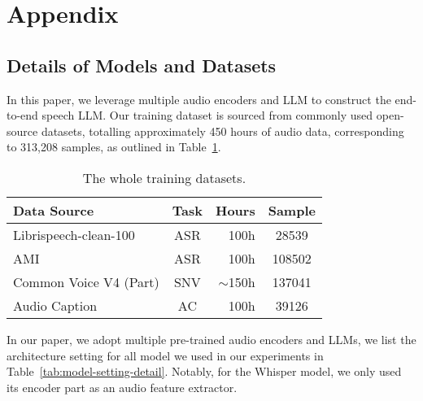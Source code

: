\newpage

\section{Appendix}
\label{sec:appendix}

\subsection{Details of Models and Datasets}\label{sec:appendix-datas-and-model}

In this paper, we leverage multiple audio encoders and LLM to construct the end-to-end speech LLM. Our training dataset is sourced from commonly used open-source datasets, totalling approximately 450 hours of audio data, corresponding to 313,208 samples, as outlined in Table~\ref{tab:whole-training-dataset}. 

\begin{table}[htp]
\small
\centering
\caption{The whole training datasets.}
\label{tab:whole-training-dataset}
\begin{tabular}{l c r c}
\toprule
Data Source & Task & Hours & Sample \\ 
\midrule
Librispeech-clean-100 & ASR & 100h & 28539 \\ 
AMI & ASR & 100h & 108502 \\ 
Common Voice V4 (Part) & SNV & $\sim$150h & 137041 \\ 
Audio Caption & AC & 100h & 39126 \\ 
\bottomrule
\end{tabular}
\end{table}

In our paper, we adopt multiple pre-trained audio encoders and LLMs, we list the architecture setting for all model we used in our experiments in Table~\ref{tab:model-setting-detail}. Notably, for the Whisper model, we only used its encoder part as an audio feature extractor.

